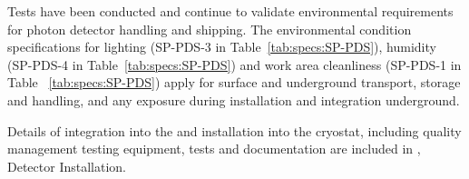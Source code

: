 Tests have been conducted and continue to validate environmental requirements for photon detector handling and shipping. The environmental condition specifications for lighting (SP-PDS-3 in Table~\ref{tab:specs:SP-PDS}), humidity (SP-PDS-4 in Table~\ref{tab:specs:SP-PDS}) and work area cleanliness (SP-PDS-1 in Table ~\ref{tab:specs:SP-PDS})
apply for surface and underground transport, storage and handling, and any exposure during installation and integration underground. 


Details of  integration into the  and installation into the cryostat, including quality management testing equipment, tests and documentation are included in \spchinstall{}, Detector Installation. 

